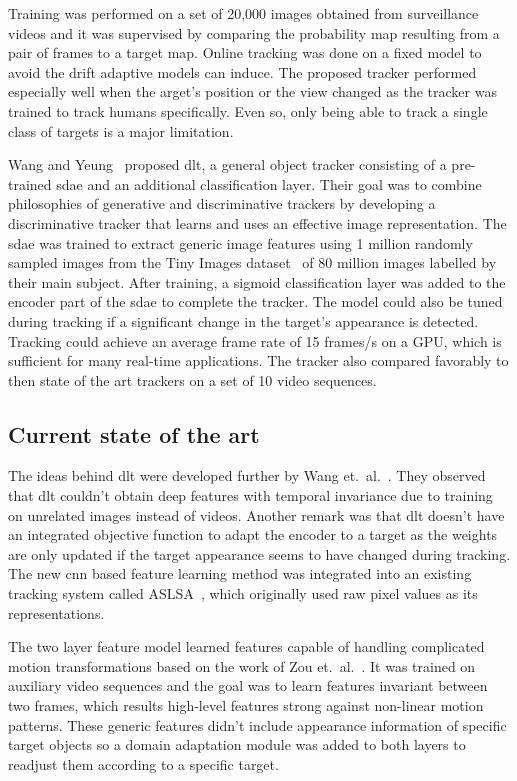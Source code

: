 Training was performed on a set of 20,000 images obtained from surveillance videos and it
was supervised by comparing the probability map resulting from a pair of frames to a
target map. Online tracking was done on a fixed model to avoid the drift adaptive models
can induce. The proposed tracker performed especially well when the arget's position or
the view changed as the tracker was trained to track humans specifically. Even so, only
being able to track a single class of targets is a major limitation.~\cite{HUMAN_CNN}

Wang and Yeung~\cite{DLT} proposed \ac{dlt}, a general object tracker consisting of a
pre-trained \ac{sdae} and an additional classification layer. Their goal was to combine
philosophies of generative and discriminative trackers by developing a discriminative
tracker that learns and uses an effective image representation. The \ac{sdae} was
trained to extract generic image features using 1 million randomly sampled images from
the Tiny Images dataset~\cite{TINY_IMAGES} of 80 million images labelled by their main
subject. After training, a sigmoid classification layer was added to the encoder part
of the \ac{sdae} to complete the tracker. The model could also be tuned during tracking
if a significant change in the target's appearance is detected. Tracking could achieve
an average frame rate of 15 frames/s on a GPU, which is sufficient for many real-time
applications. The tracker also compared favorably to then state of the art trackers on
a set of 10 video sequences.~\cite{DLT}

\subsection{Current state of the art}

The ideas behind \ac{dlt} were developed further by Wang et.~al.~\cite{LEARNED_HIERARCH}.
They observed that \ac{dlt} couldn't obtain deep features with temporal invariance due to
training on unrelated images instead of videos. Another remark was that \ac{dlt} doesn't
have an integrated objective function to adapt the encoder to a target as the weights are
only updated if the target appearance seems to have changed during tracking. The new
\ac{cnn} based feature learning method was integrated into an existing tracking system
called ASLSA~\cite{ASLSA}, which originally used raw pixel values as its representations.~\cite{LEARNED_HIERARCH}

The two layer feature model learned features capable of handling complicated motion
transformations based on the work of Zou et.~al.~\cite{INVARIANT_FEATS}. It was trained
on auxiliary video sequences and the goal was to learn features invariant between two
frames, which results high-level features strong against non-linear motion patterns. These
generic features didn't include appearance information of specific target objects so a
domain adaptation module was added to both layers to readjust them according to a
specific target.~\cite{LEARNED_HIERARCH}

